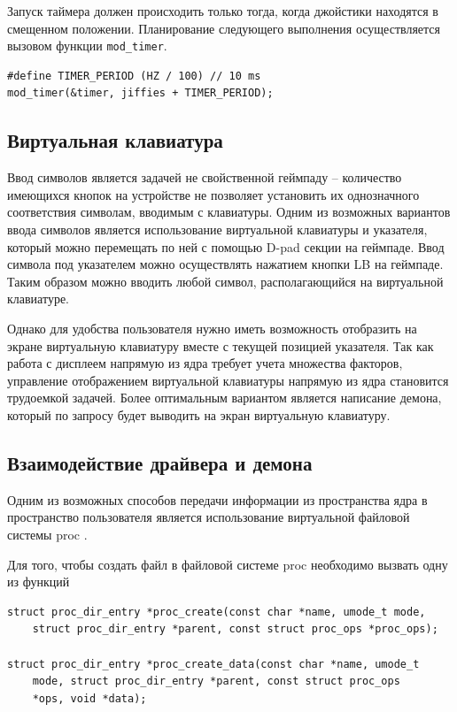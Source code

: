 Запуск таймера должен происходить только тогда, когда джойстики находятся в смещенном положении. Планирование следующего выполнения осуществляется вызовом функции \texttt{mod\_timer}.

\begin{small}
\begin{verbatim}
#define TIMER_PERIOD (HZ / 100) // 10 ms
mod_timer(&timer, jiffies + TIMER_PERIOD);
\end{verbatim}
\end{small}

\subsection{Виртуальная клавиатура}

Ввод символов является задачей не свойственной геймпаду -- количество имеющихся кнопок на устройстве не позволяет установить их однозначного соответствия символам, вводимым с клавиатуры. Одним из возможных вариантов ввода символов является использование виртуальной клавиатуры и указателя, который можно перемещать по ней с помощью D-pad секции на геймпаде. Ввод символа под указателем можно осуществлять нажатием кнопки LB на геймпаде. Таким образом можно вводить любой символ, располагающийся на виртуальной клавиатуре.

Однако для удобства пользователя нужно иметь возможность отобразить на экране виртуальную клавиатуру вместе с текущей позицией указателя. Так как работа с дисплеем напрямую из ядра требует учета множества факторов, управление отображением виртуальной клавиатуры напрямую из ядра становится трудоемкой задачей. Более оптимальным вариантом является написание демона, который по запросу будет выводить на экран виртуальную клавиатуру.

\subsection{Взаимодействие драйвера и демона}

Одним из возможных способов передачи информации из пространства ядра в пространство пользователя является использование виртуальной файловой системы proc \cite{vfs-proc}.

Для того, чтобы создать файл в файловой системе proc необходимо вызвать одну из функций

\begin{small}
\begin{verbatim}
struct proc_dir_entry *proc_create(const char *name, umode_t mode,
    struct proc_dir_entry *parent, const struct proc_ops *proc_ops);

struct proc_dir_entry *proc_create_data(const char *name, umode_t
    mode, struct proc_dir_entry *parent, const struct proc_ops
    *ops, void *data);
\end{verbatim}
\end{small}

